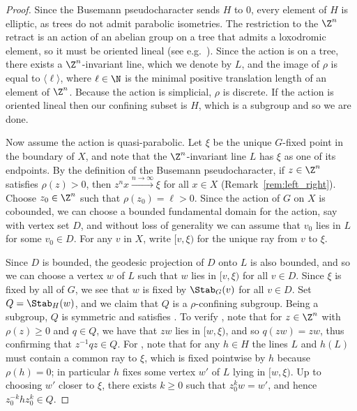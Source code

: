 \begin{proof}
Since the Busemann pseudocharacter sends $H$ to $0$, every element of $H$ is elliptic, as trees do not admit parabolic isometries. The restriction to the $\Z^n$ retract is an action of an abelian group on a tree that admits a loxodromic element, so it must be oriented lineal (see e.g.~\cite[Proposition 3.2]{NL}). Since the action is on a tree, there exists a $\Z^n$-invariant line, which we denote by $L$, and the image of $\rho$ is equal to $\langle \ell \rangle$, where $\ell \in \N$ is the minimal positive translation length of an element of $\Z^n$. Because the action is simplicial, $\rho$ is discrete. 
If the action is oriented lineal then our confining subset is $H$, which is a subgroup and so we are done.

Now assume the action is quasi-parabolic. Let $\xi$ be the unique $G$-fixed point in the boundary of $X$, and note that the $\Z^n$-invariant line $L$ has $\xi$ as one of its endpoints. By the definition of the Busemann pseudocharacter, if $z \in \Z^n$ satisfies $\rho(z) > 0$, then $z^n x \xrightarrow{n \to \infty} \xi$ for all $x \in X$ (Remark~\ref{rem:left_right}). Choose $z_0\in\Z^n$ such that $\rho(z_0) = \ell > 0$. Since the action of $G$ on $X$ is cobounded, we can choose a bounded fundamental domain for the action, say with vertex set $D$, and without loss of generality we can assume that $v_0$ lies in $L$ for some $v_0\in D$. For any $v$ in $X$, write $[v,\xi)$ for the unique ray from $v$ to $\xi$.

Since $D$ is bounded, the geodesic projection of $D$ onto $L$ is also bounded, and so we can choose a vertex $w$ of $L$ such that $w$ lies in $[v,\xi)$ for all $v\in D$. Since $\xi$ is fixed by all of $G$, we see that $w$ is fixed by $\Stab_G(v)$ for all $v\in D$. Set $Q=\Stab_H(w)$, and we claim that $Q$ is a $\rho$-confining subgroup. Being a subgroup, $Q$ is symmetric and satisfies \ProdConf. To verify \StayInConf, note that for $z\in \Z^n$ with $\rho(z)\ge 0$ and $q\in Q$, we have that $zw$ lies in $[w,\xi)$, and so $q(zw)=zw$, thus confirming that $z^{-1}qz\in Q$. For \GetInConf, note that for any $h\in H$ the lines $L$ and $h(L)$ must contain a common ray to $\xi$, which is fixed pointwise by $h$ because $\rho(h) = 0$; in particular $h$ fixes some vertex $w'$ of $L$ lying in $[w,\xi)$. Up to choosing $w'$ closer to $\xi$, there exists $k \geq 0$ such that $z_0^k w = w'$, and hence $z_0^{-k}hz_0^k\in Q$.


\end{proof}
